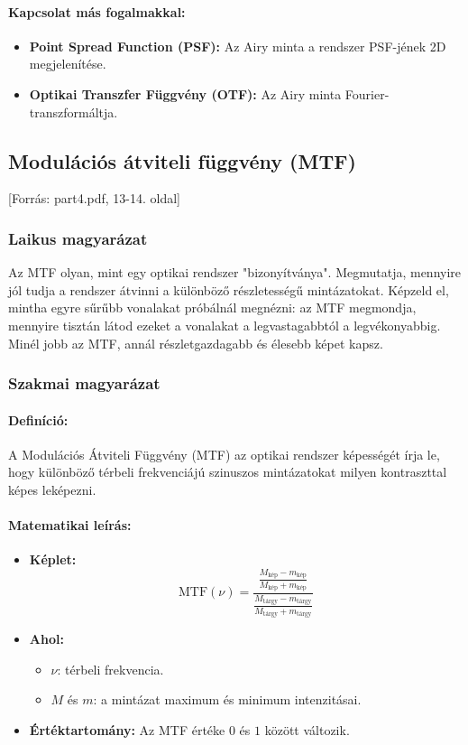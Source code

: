 \documentclass[a4paper,12pt]{article}
\begin{document}
\paragraph{Kapcsolat más fogalmakkal:} 
\begin{itemize}
    \item \textbf{Point Spread Function (PSF):} Az Airy minta a rendszer PSF-jének 2D megjelenítése.
    \item \textbf{Optikai Transzfer Függvény (OTF):} Az Airy minta Fourier-transzformáltja.
\end{itemize}

\subsection{Modulációs átviteli függvény (MTF)} [Forrás: part4.pdf, 13-14. oldal]

\subsubsection{Laikus magyarázat} 
Az MTF olyan, mint egy optikai rendszer "bizonyítványa". Megmutatja, mennyire jól tudja a rendszer átvinni a különböző részletességű mintázatokat. Képzeld el, mintha egyre sűrűbb vonalakat próbálnál megnézni: az MTF megmondja, mennyire tisztán látod ezeket a vonalakat a legvastagabbtól a legvékonyabbig. Minél jobb az MTF, annál részletgazdagabb és élesebb képet kapsz.

\subsubsection{Szakmai magyarázat}

\paragraph{Definíció:} 
A Modulációs Átviteli Függvény (MTF) az optikai rendszer képességét írja le, hogy különböző térbeli frekvenciájú szinuszos mintázatokat milyen kontraszttal képes leképezni.

\paragraph{Matematikai leírás:} 
\begin{itemize}
    \item \textbf{Képlet:} 
    \[
    \text{MTF}(\nu) = \frac{\frac{M_{\text{kép}} - m_{\text{kép}}}{M_{\text{kép}} + m_{\text{kép}}}}{\frac{M_{\text{tárgy}} - m_{\text{tárgy}}}{M_{\text{tárgy}} + m_{\text{tárgy}}}}
    \]
    \item \textbf{Ahol:}
    \begin{itemize}
        \item \( \nu \): térbeli frekvencia.
        \item \( M \) és \( m \): a mintázat maximum és minimum intenzitásai.
    \end{itemize}
    \item \textbf{Értéktartomány:} Az MTF értéke \( 0 \) és \( 1 \) között változik.
\end{itemize}
\end{document}
